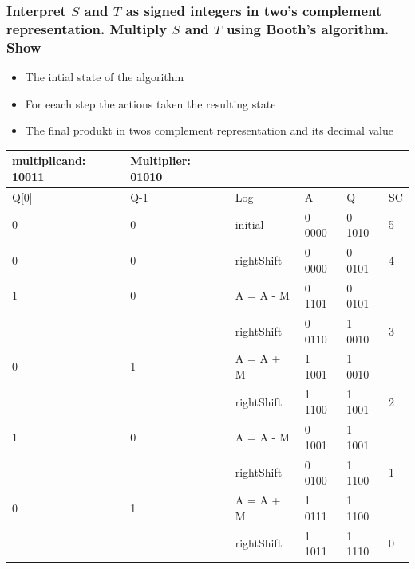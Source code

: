 \documentclass[12pt, a4paper]{article}
\begin{document}
			\subsubsection{Interpret $S$ and $T$ as signed integers in two’s complement representation. Multiply $S$ and $T$ using Booth’s algorithm. Show}
				\begin{itemize}
					\item The intial state of the algorithm
					\item For eeach step the actions taken the resulting state
					\item The final produkt in twos complement representation and its decimal value
				\end{itemize}
				\begin{table}[h!]
				\begin{tabular}{|l|l|l|l|l|l|}
				multiplicand: 10011 & Multiplier: 01010 \\
				\hline
				Q[0] & Q-1 & Log & A & Q & SC\\
				\hline
				0 & 0 & initial & 0 0000  & 0 1010  & 5\\
				\hline
				0 & 0 &  rightShift & 0 0000  & 0 0101  & 4\\
				\hline
				1 & 0 & A = A - M &0 1101  & 0 0101 &\\
				\hline
				& &  rightShift & 0 0110  & 1 0010  & 3\\
				\hline
				0 & 1 & A = A + M & 1 1001  & 1 0010 &\\
				\hline
				& &  rightShift & 1 1100  & 1 1001  & 2\\
				\hline
				1 & 0 & A = A - M &0 1001  & 1 1001 &\\
				\hline
				& &  rightShift & 0 0100  & 1 1100  & 1\\
				\hline
				0 & 1 & A = A + M & 1 0111  & 1 1100 &\\
				\hline
				& &  rightShift & 1 1011  & 1 1110  & 0\\
				\hline
				\end{tabular}
				\end{table}
\end{document}
